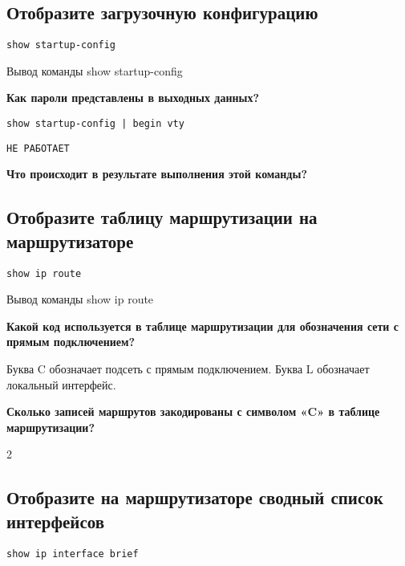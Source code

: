 \subsection{Отобразите загрузочную конфигурацию}

\begin{verbatim}
show startup-config
\end{verbatim}

\begin{image}
	\caption{Вывод команды show startup-config}
\end{image}

\textbf{Как пароли представлены в выходных данных?}

\begin{verbatim}
show startup-config | begin vty
\end{verbatim}

\texttt{НЕ РАБОТАЕТ}

\textbf{Что происходит в результате выполнения этой команды?}

\subsection{Отобразите таблицу маршрутизации на маршрутизаторе}

\begin{verbatim}
show ip route
\end{verbatim}

\begin{image}
	\caption{Вывод команды show ip route}
\end{image}

\textbf{Какой код используется в таблице маршрутизации
для обозначения сети с прямым подключением?}

Буква C обозначает подсеть с прямым подключением.
Буква L обозначает локальный интерфейс.

\textbf{Сколько записей маршрутов закодированы с символом «C»
в таблице маршрутизации?}

2

\subsection{Отобразите на маршрутизаторе сводный список интерфейсов}

\begin{verbatim}
show ip interface brief
\end{verbatim}

